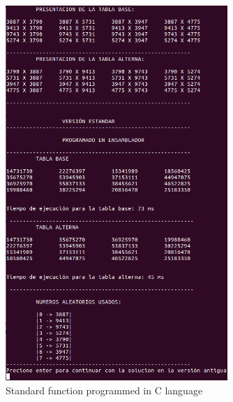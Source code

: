 \documentclass[legalpaper,12pt]{article}
\begin{document}
\begin{figure}[htbp]
  \centering
    \includegraphics[width=0.75\textwidth]{Normal_E.png}
  \caption{Standard function programmed in C language}
  \label{fig:normal_e}
\end{figure}
\end{document}

